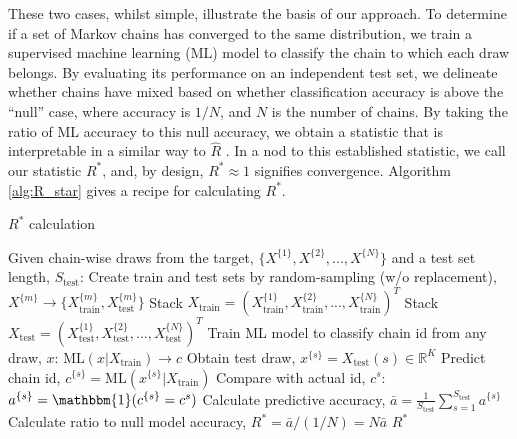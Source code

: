 \documentclass{article}
\begin{document}
These two cases, whilst simple, illustrate the basis of our approach. To determine if a set of Markov chains has converged to the same distribution, we train a supervised machine learning (ML) model to classify the chain to which each draw belongs. By evaluating its performance on an independent test set, we delineate whether chains have mixed based on whether classification accuracy is above the ``null'' case, where accuracy is $1/{N}$, and $N$ is the number of chains. By taking the ratio of ML accuracy to this null accuracy, we obtain a statistic that is interpretable in a similar way to $\widehat{R}$ \citep{gelman2013bayesian}. In a nod to this established statistic, we call our statistic $R^*$, and, by design, $R^*\approx 1$ signifies convergence. Algorithm \ref{alg:R_star} gives a recipe for calculating $R^*$.

\begin{algorithm}[tb]
	\caption{$R^*$ calculation}
	\label{alg:R_star}
	\begin{algorithmic}
		\STATE Given chain-wise draws from the target, $\{X^{\{1\}},X^{\{2\}},...,X^{\{N\}}\}$ and a test set length, $S_\text{test}$:
		\STATE Create train and test sets by random-sampling (w/o replacement), $X^{\{m\}}\rightarrow\{X^{\{m\}}_\text{train},X^{\{m\}}_\text{test}\}$
		\ENDFOR
		\STATE Stack $X_\text{train} = (X^{\{1\}}_\text{train},X^{\{2\}}_\text{train},...,X^{\{N\}}_\text{train})^T$
		\STATE Stack $X_\text{test} = (X^{\{1\}}_\text{test},X^{\{2\}}_\text{test},...,X^{\{N\}}_\text{test})^T$
		\STATE Train ML model to classify chain id from any draw, $x$: $\text{ML}(x|X_\text{train}) \rightarrow c$
		\STATE Obtain test draw, $x^{\{s\}}=X_\text{test}(s)\in \mathbb{R}^K$
		\STATE Predict chain id, $c^{\{s\}} = \text{ML}(x^{\{s\}}|X_\text{train})$
		\STATE Compare with actual id, $c^s$: $a^{\{s\}}=\mathbbm{1}(c^{\{s\}}=c^s)$
		\ENDFOR
		\STATE Calculate predictive accuracy, $\bar{a} = \frac{1}{S_\text{test}} \sum_{s=1}^{S_\text{test}} a^{\{s\}}$
		\STATE Calculate ratio to null model accuracy, $R^* = \bar{a} / (1 / N) = N \bar{a}$
		\RETURN $R^*$
	\end{algorithmic}
\end{algorithm}
\end{document}

